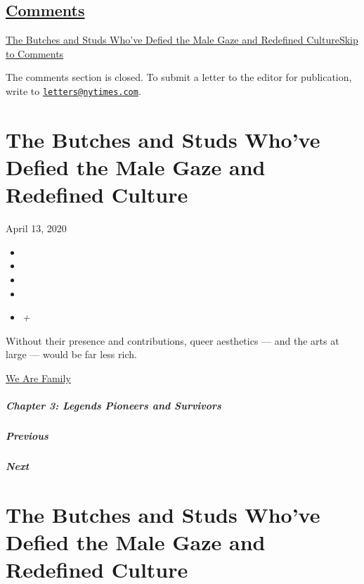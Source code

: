 \hypertarget{comments}{%
\subsection{\texorpdfstring{\protect\hyperlink{commentsContainer}{Comments}}{Comments}}\label{comments}}

\href{}{The Butches and Studs Who've Defied the Male Gaze and Redefined
Culture}\href{}{Skip to Comments}

The comments section is closed. To submit a letter to the editor for
publication, write to
\href{mailto:letters@nytimes.com}{\nolinkurl{letters@nytimes.com}}.

\hypertarget{the-butches-and-studs-whove-defied-the-male-gaze-and-redefined-culture}{%
\section{The Butches and Studs Who've Defied the Male Gaze and Redefined
Culture}\label{the-butches-and-studs-whove-defied-the-male-gaze-and-redefined-culture}}

April 13, 2020

\begin{itemize}
\item
\item
\item
\item
\item
  \emph{+}
\end{itemize}

Without their presence and contributions, queer aesthetics --- and the
arts at large --- would be far less rich.

\href{https://www.nytimes.com/interactive/2020/04/13/t-magazine/culture-issue-2020.html}{We
Are Family}

\hypertarget{chapter-3-legends-pioneers-and-survivors}{%
\subparagraph{Chapter 3: Legends Pioneers and
Survivors}\label{chapter-3-legends-pioneers-and-survivors}}

\hypertarget{previous}{%
\subparagraph{Previous}\label{previous}}

\hypertarget{next}{%
\subparagraph{Next}\label{next}}

\hypertarget{the-butches-and-studs-whove-defied-the-male-gaze-and-redefined-culture-1}{%
\section{The Butches and Studs Who've Defied the Male Gaze and Redefined
Culture}\label{the-butches-and-studs-whove-defied-the-male-gaze-and-redefined-culture-1}}

